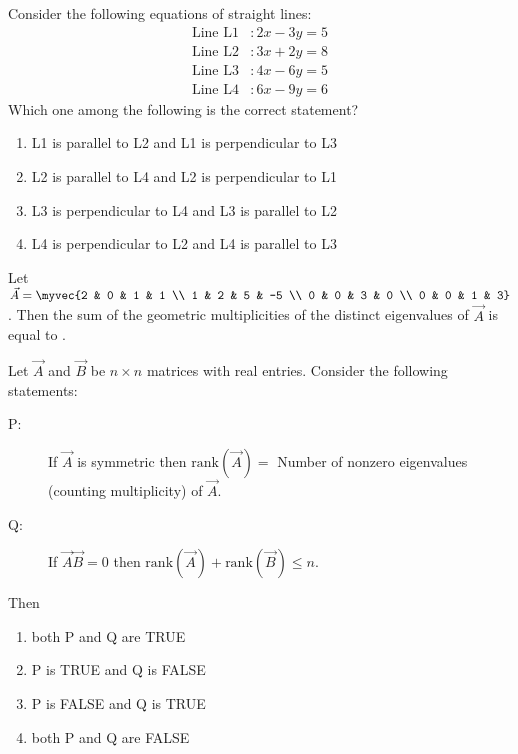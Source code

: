 \item Consider the following equations of straight lines:
\begin{align*}
	\text{Line L1} &\colon 2x - 3y = 5 \\
	\text{Line L2} &\colon 3x + 2y = 8 \\
	\text{Line L3} &\colon 4x - 6y = 5 \\
	\text{Line L4} &\colon 6x - 9y = 6
\end{align*}
Which one among the following is the correct statement?
\hfill{}
\begin{enumerate}
	\item L1 is parallel to L2 and L1 is perpendicular to L3
	\item L2 is parallel to L4 and L2 is perpendicular to L1
	\item L3 is perpendicular to L4 and L3 is parallel to L2
	\item L4 is perpendicular to L2 and L4 is parallel to L3
\end{enumerate}
\item Let $\vec{A} = \myvec{2 & 0 & 1 & 1 \\ 1 & 2 & 5 & -5 \\ 0 & 0 & 3 & 0 \\ 0 & 0 & 1 & 3}$. Then the sum of the geometric multiplicities of the distinct eigenvalues of $\vec{A}$ is equal to \underline{\hspace{2cm}}.
\hfill{}
\item Let $\vec{A}$ and $\vec{B}$ be $n \times n$ matrices with real entries.
Consider the following statements:
\begin{description}
    \item[P:] If $\vec{A}$ is symmetric then $\text{rank}(\vec{A}) =$ Number of nonzero eigenvalues (counting multiplicity) of  $\vec{A}$.
    \item[Q:] If $\vec{A}\vec{B} = 0$ then $\text{rank}(\vec{A}) + \text{rank}(\vec{B}) \leq n$.
\end{description}
Then
\hfill{}
\begin{multicols}{2}
\begin{enumerate}
    \item both P and Q are TRUE
    \item P is TRUE and Q is FALSE
    \item P is FALSE and Q is TRUE
    \item both P and Q are FALSE
\end{enumerate}
\end{multicols}
